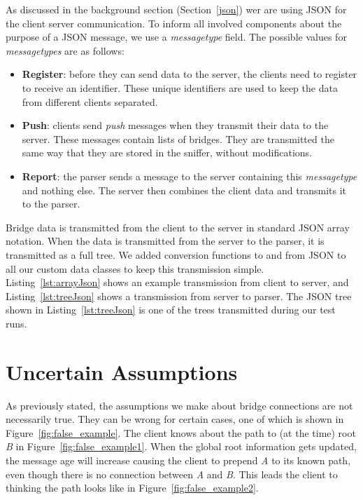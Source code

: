 As discussed in the background section (Section~\ref{json}) wer are using JSON for the client server communication.
To inform all involved components about the purpose of a JSON message, we use a \textit{messagetype} field.
The possible values for \textit{messagetypes} are as follows:
\begin{itemize}
    \item \textbf{Register}: before they can send data to the server, the clients need to register to receive an identifier.
        These unique identifiers are used to keep the data from different clients separated.
    \item \textbf{Push}: clients send \textit{push} messages when they transmit their data to the server.
        These messages contain lists of bridges.
        They are transmitted the same way that they are stored in the sniffer, without modifications.
    \item \textbf{Report}: the parser sends a message to the server containing this \textit{messagetype} and nothing else.
        The server then combines the client data and transmits it to the parser.
\end{itemize}
Bridge data is transmitted from the client to the server in standard JSON array notation.
When the data is transmitted from the server to the parser, it is transmitted as a full tree.
We added conversion functions to and from JSON to all our custom data classes to keep this transmission simple.
Listing~\ref{lst:arrayJson} shows an example transmission from client to server, and Listing~\ref{lst:treeJson} shows a transmission from server to parser.
The JSON tree shown in Listing~\ref{lst:treeJson} is one of the trees transmitted during our test runs.



\section{Uncertain Assumptions}
\label{uncertain_assumptions}
As previously stated, the assumptions we make about bridge connections are not necessarily true.
They can be wrong for certain cases, one of which is shown in Figure~\ref{fig:false_example}.
The client knows about the path to (at the time) root \textit{B} in Figure~\ref{fig:false_example1}.
When the global root information gets updated, the message age will increase causing the client to prepend \textit{A} to its known path, even though there is no connection between \textit{A} and \textit{B}.
This leads the client to thinking the path looks like in Figure~\ref{fig:false_example2}.


